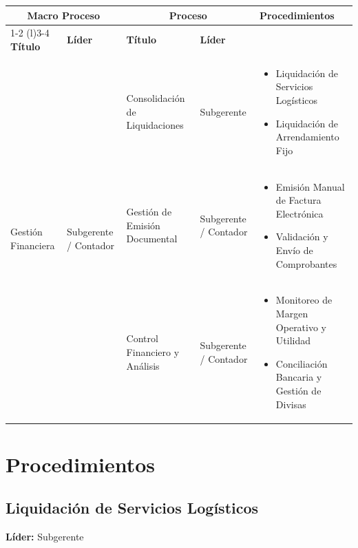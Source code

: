 \documentclass[11pt,letterpaper]{report}
\begin{document}
\begin{center}
  \small
  \begin{tabularx}{\textwidth}{p{}p{}XXp{}}
  \toprule
  \multicolumn{2}{c}{\textbf{Macro Proceso}} & \multicolumn{2}{c}{\textbf{Proceso}} & \multirow{2}{*}{\textbf{Procedimientos}} \\
  \cmidrule(r){1-2} \cmidrule(l){3-4}
  \textbf{Título} & \textbf{Líder} & \textbf{Título} & \textbf{Líder} & \\
  \midrule
  \multirow{3}{=}{Gestión Financiera} & \multirow{3}{=}{Subgerente / Contador} & Consolidación de Liquidaciones & Subgerente & 
  \begin{itemize} \item Liquidación de Servicios Logísticos \item Liquidación de Arrendamiento Fijo \end{itemize} \\
  \cmidrule{3-5}
  & & Gestión de Emisión Documental & Subgerente / Contador & 
  \begin{itemize} \item Emisión Manual de Factura Electrónica \item Validación y Envío de Comprobantes \end{itemize} \\
  \cmidrule{3-5}
  & & Control Financiero y Análisis & Subgerente / Contador & 
  \begin{itemize} \item Monitoreo de Margen Operativo y Utilidad \item Conciliación Bancaria y Gestión de Divisas \end{itemize} \\
  \bottomrule
  \end{tabularx}
\end{center}

\newpage

\chapter{Procedimientos}

\section{Liquidación de Servicios Logísticos}
\textbf{Líder:} Subgerente
\end{document}
